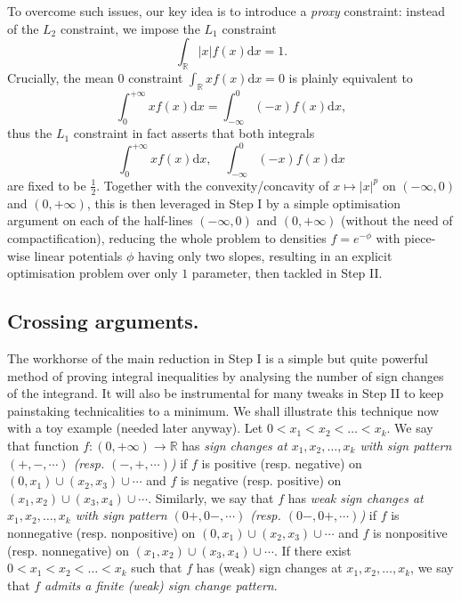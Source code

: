 \documentclass[10pt]{amsart}
\newcommand{\dd}{\mathrm{d}}
\newcommand{\1}{\textbf{1}}
\newcommand{\R}{\mathbb{R}}
\newcommand{\red}{}
\theoremstyle{remark}
\theoremstyle{definition}
\begin{document}
To overcome such issues, our key idea is to introduce a \emph{proxy} constraint: instead of the $L_2$ constraint, we impose the $L_1$ constraint
\[ 
\int_{\R} |x|f(x) \dd x = 1.
 \]
Crucially, the mean $0$ constraint  $\int_\R xf(x)\dd x = 0$ is plainly equivalent to
\[ 
\int_0^{+\infty} xf(x) \dd x= \int_{-\infty}^0 (-x)f(x) \dd x,
 \]
thus the $L_1$ constraint in fact asserts that both integrals 
\[ 
\int_0^{+\infty} xf(x) \dd x, \quad \int_{-\infty}^0 (-x)f(x) \dd x
 \]
are fixed to be $\frac12$. Together with the convexity/concavity of $x \mapsto |x|^p$ on $(-\infty, 0)$ and $(0, +\infty)$, this is then leveraged in Step I by a simple optimisation argument on each of the half-lines $(-\infty, 0)$ and $(0, +\infty)$ (without the need of compactification), reducing the whole problem to densities $f = e^{-\phi}$ with piece-wise linear potentials $\phi$ having only two slopes, resulting in an explicit {\red optimisation} problem over only $1$ parameter, then tackled in Step II. 

\subsection{Crossing arguments.}
The workhorse of the main reduction in Step I is a simple but quite powerful method of proving integral inequalities by analysing the number of sign changes of the integrand. It will also be instrumental for many tweaks in Step II to keep painstaking technicalities to a minimum. We shall illustrate this technique now with a toy example (needed later anyway). %
Let $0<x_1<x_2<\dots<x_k$. We say that function $f\colon (0,+\infty) \to \R$ has \emph{sign changes at $x_1,x_2,\dots,x_k$ with sign pattern $(+,-,\cdots)$ (resp. $(-,+,\cdots)$)} if $f$ is positive (resp. negative) on $(0,x_1)\cup (x_2,x_3)\cup \cdots$ and $f$ is negative (resp. positive) on $(x_1,x_2)\cup(x_3,x_4)\cup\cdots$. Similarly, we say that $f$ has \emph{weak sign changes at $x_1,x_2,\dots,x_k$ with sign pattern $(0+,0-,\cdots)$ (resp. $(0-,0+,\cdots)$)} if $f$ is nonnegative (resp. nonpositive) on $(0,x_1)\cup (x_2,x_3)\cup \cdots$ and $f$ is nonpositive (resp. nonnegative) on $(x_1,x_2)\cup(x_3,x_4)\cup\cdots$. If there exist $0<x_1<x_2<\dots<x_k$ such that $f$ has (weak) sign changes at $x_1,x_2,\dots,x_k$, we say that $f$ \emph{admits a finite (weak) sign change pattern}.
\end{document}
